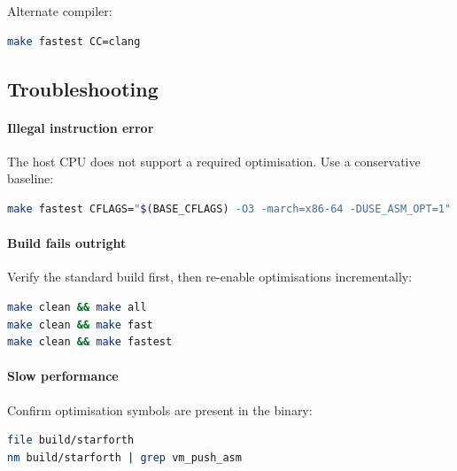 Alternate compiler:

\begin{lstlisting}[language=bash]
make fastest CC=clang
\end{lstlisting}

\subsection{Troubleshooting}
\label{sec:quickstart-trouble}

\paragraph{Illegal instruction error}
The host CPU does not support a required optimisation.  Use a conservative
baseline:

\begin{lstlisting}[language=bash]
make fastest CFLAGS="$(BASE_CFLAGS) -O3 -march=x86-64 -DUSE_ASM_OPT=1"
\end{lstlisting}

\paragraph{Build fails outright}
Verify the standard build first, then re-enable optimisations incrementally:

\begin{lstlisting}[language=bash]
make clean && make all
make clean && make fast
make clean && make fastest
\end{lstlisting}

\paragraph{Slow performance}
Confirm optimisation symbols are present in the binary:

\begin{lstlisting}[language=bash]
file build/starforth
nm build/starforth | grep vm_push_asm
\end{lstlisting}
